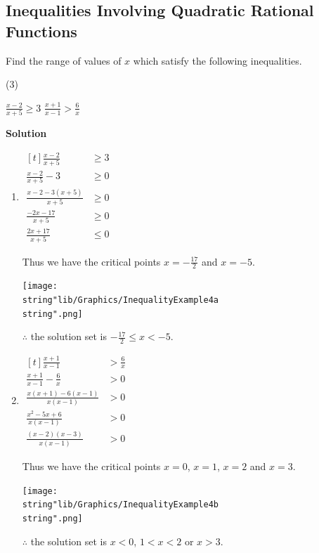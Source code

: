 \documentclass[11pt,a4paper]{book}
\begin{document}
\subsection{Inequalities Involving Quadratic Rational Functions}
\begin{example}{}
Find the range of values of $x$ which satisfy the following inequalities.

\begin{tasks}[label=(\alph*),label-width=3.5ex](3)

\task ${\displaystyle \frac{x-2}{x+5}\geq3}$
\task ${\displaystyle \frac{x+1}{x-1}>\frac{6}{x}}$

\end{tasks}

\textbf{\large{}Solution}{\large\par}

\begin{enumerate}[label=(\alph*),itemsep=1cm]

\item
$
\begin{aligned}[t]
\frac{x-2}{x+5} & \geq3\\
\frac{x-2}{x+5}-3 & \geq0\\
\frac{x-2-3\left(x+5\right)}{x+5} & \geq0\\
\frac{-2x-17}{x+5} & \geq0\\
\frac{2x+17}{x+5} & \leq0
\end{aligned}
$

Thus we have the critical points ${\displaystyle x=-\frac{17}{2}}$
and $x=-5$.
\begin{center}
\texttt{[image: \\string"lib/Graphics/InequalityExample4a\\string".png]}
\par\end{center}

$\therefore$ the solution set is ${\displaystyle -\frac{17}{2}\leq x<-5}$.

\item
$
\begin{aligned}[t]
\frac{x+1}{x-1} & >\frac{6}{x}\\
\frac{x+1}{x-1}-\frac{6}{x} & >0\\
\frac{x\left(x+1\right)-6\left(x-1\right)}{x\left(x-1\right)} & >0\\
\frac{x^{2}-5x+6}{x\left(x-1\right)} & >0\\
\frac{\left(x-2\right)\left(x-3\right)}{x\left(x-1\right)} & >0
\end{aligned}
$

Thus we have the critical points ${\displaystyle x=0}$, $x=1$, $x=2$
and $x=3$.
\begin{center}
\texttt{[image: \\string"lib/Graphics/InequalityExample4b\\string".png]}
\par\end{center}

$\therefore$ the solution set is $x<0$, $1<x<2$ or $x>3$.

\end{enumerate}
\end{example}
\end{document}
